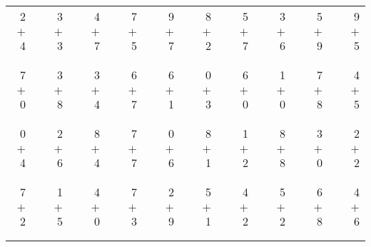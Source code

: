 \documentclass[12pt, letterpaper]{article}
\begin{document}
\begin{tabular}{rrrrrrrrrrrrrrrrrrr}
2 & & 3 & & 4 & & 7 & & 9 & & 8 & & 5 & & 3 & & 5 & & 9\\
$+$ 4 & & $+$ 3 & & $+$ 7 & & $+$ 5 & & $+$ 7 & & $+$ 2 & & $+$ 7 & & $+$ 6 & & $+$ 9 & & $+$ 5\\
\cline{1-1} \cline{3-3} \cline{5-5} \cline{7-7} \cline{9-9} \cline{11-11} \cline{13-13} \cline{15-15} \cline{17-17} \cline{19-19} \\ \\
7 & & 3 & & 3 & & 6 & & 6 & & 0 & & 6 & & 1 & & 7 & & 4\\
$+$ 0 & & $+$ 8 & & $+$ 4 & & $+$ 7 & & $+$ 1 & & $+$ 3 & & $+$ 0 & & $+$ 0 & & $+$ 8 & & $+$ 5\\
\cline{1-1} \cline{3-3} \cline{5-5} \cline{7-7} \cline{9-9} \cline{11-11} \cline{13-13} \cline{15-15} \cline{17-17} \cline{19-19} \\ \\
0 & & 2 & & 8 & & 7 & & 0 & & 8 & & 1 & & 8 & & 3 & & 2\\
$+$ 4 & & $+$ 6 & & $+$ 4 & & $+$ 7 & & $+$ 6 & & $+$ 1 & & $+$ 2 & & $+$ 8 & & $+$ 0 & & $+$ 2\\
\cline{1-1} \cline{3-3} \cline{5-5} \cline{7-7} \cline{9-9} \cline{11-11} \cline{13-13} \cline{15-15} \cline{17-17} \cline{19-19} \\ \\
7 & & 1 & & 4 & & 7 & & 2 & & 5 & & 4 & & 5 & & 6 & & 4\\
$+$ 2 & & $+$ 5 & & $+$ 0 & & $+$ 3 & & $+$ 9 & & $+$ 1 & & $+$ 2 & & $+$ 2 & & $+$ 8 & & $+$ 6\\
\cline{1-1} \cline{3-3} \cline{5-5} \cline{7-7} \cline{9-9} \cline{11-11} \cline{13-13} \cline{15-15} \cline{17-17} \cline{19-19} \\ \\
\end{tabular}
\newpage
\end{document}
